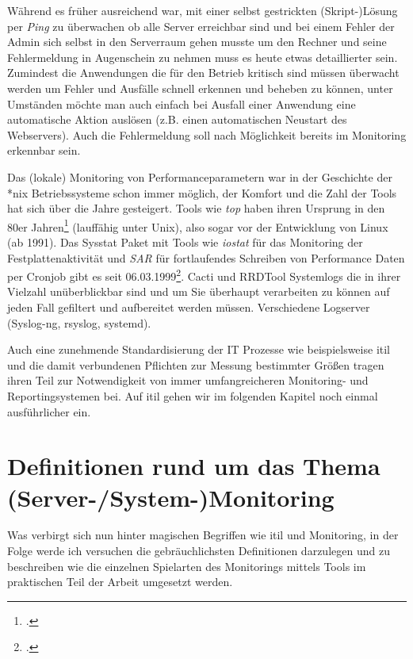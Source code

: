 \documentclass[12pt,a4paper,parskip,listof=totoc,bibliography=totoc]{scrreprt}
\begin{document}
	Während es früher ausreichend war, mit einer selbst gestrickten (Skript-)Lösung per \textit{Ping} zu überwachen ob alle Server erreichbar sind und bei einem Fehler der Admin sich selbst in den Serverraum gehen musste um den Rechner und seine Fehlermeldung in Augenschein zu nehmen muss es heute etwas detaillierter sein. Zumindest die Anwendungen die für den Betrieb kritisch sind müssen überwacht werden um Fehler und Ausfälle schnell erkennen und beheben zu können, unter Umständen möchte man auch einfach bei Ausfall einer Anwendung eine automatische Aktion auslösen (z.B. einen automatischen Neustart des Webservers). Auch die Fehlermeldung soll nach Möglichkeit bereits im Monitoring erkennbar sein.
	
	Das (lokale) Monitoring von Performanceparametern war in der Geschichte der *nix Betriebssysteme schon immer möglich, der Komfort und die Zahl der Tools hat sich über die Jahre gesteigert. Tools wie \textit{top} haben ihren Ursprung in den 80er Jahren\footcite{top} (lauffähig unter Unix), also sogar vor der Entwicklung von Linux (ab 1991). Das Sysstat Paket mit Tools wie \textit{iostat} für das Monitoring der Festplattenaktivität und \textit{SAR} für fortlaufendes Schreiben von Performance Daten per Cronjob gibt es seit 06.03.1999\footcite{sysstatchangelog}.
	Cacti und RRDTool
	Systemlogs die in ihrer Vielzahl unüberblickbar sind und um Sie überhaupt verarbeiten zu können auf jeden Fall gefiltert und aufbereitet werden müssen. Verschiedene Logserver (Syslog-ng, rsyslog, systemd).
	
	Auch eine zunehmende Standardisierung der IT Prozesse wie beispielsweise \acrfull{itil} und die damit verbundenen Pflichten zur Messung bestimmter Größen tragen ihren Teil zur Notwendigkeit von immer umfangreicheren Monitoring- und Reportingsystemen bei. Auf \acrshort{itil} gehen wir im folgenden Kapitel noch einmal ausführlicher ein.
	
	\section{Definitionen rund um das Thema (Server-/System-)Monitoring}
	Was verbirgt sich nun hinter magischen Begriffen wie \acrshort{itil} und Monitoring, in der Folge werde ich versuchen die gebräuchlichsten Definitionen darzulegen und zu beschreiben wie die einzelnen Spielarten des Monitorings mittels Tools im praktischen Teil der Arbeit umgesetzt werden.
\end{document}
